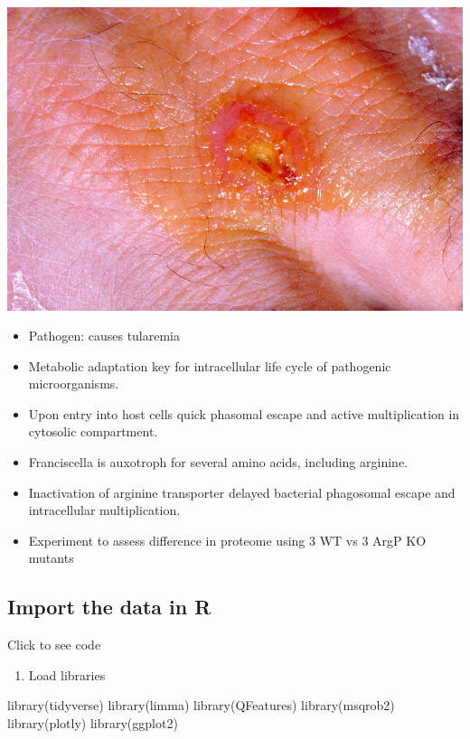 \documentclass[
]{article}
\newenvironment{Shaded}{\begin{snugshade}}{\end{snugshade}}
\newcommand{\FunctionTok}[1]{\textcolor[rgb]{0.00,0.00,0.00}{#1}}
\newcommand{\NormalTok}[1]{#1}
\providecommand{\tightlist}{%
  \setlength{\itemsep}{0pt}\setlength{\parskip}{0pt}}
\begin{document}
\includegraphics{./figures/tularemia_lesion.jpg}

\begin{itemize}
\tightlist
\item
  Pathogen: causes tularemia
\item
  Metabolic adaptation key for intracellular life cycle of pathogenic
  microorganisms.
\item
  Upon entry into host cells quick phasomal escape and active
  multiplication in cytosolic compartment.
\item
  Franciscella is auxotroph for several amino acids, including arginine.
\item
  Inactivation of arginine transporter delayed bacterial phagosomal
  escape and intracellular multiplication.
\item
  Experiment to assess difference in proteome using 3 WT vs 3 ArgP KO
  mutants
\end{itemize}

\hypertarget{import-the-data-in-r}{%
\subsection{Import the data in R}\label{import-the-data-in-r}}

Click to see code

\begin{enumerate}
\def\labelenumi{\arabic{enumi}.}
\tightlist
\item
  Load libraries
\end{enumerate}

\begin{Shaded}
\begin{Highlighting}[]
\FunctionTok{library}\NormalTok{(tidyverse)}
\FunctionTok{library}\NormalTok{(limma)}
\FunctionTok{library}\NormalTok{(QFeatures)}
\FunctionTok{library}\NormalTok{(msqrob2)}
\FunctionTok{library}\NormalTok{(plotly)}
\FunctionTok{library}\NormalTok{(ggplot2)}
\end{Highlighting}
\end{Shaded}
\end{document}
